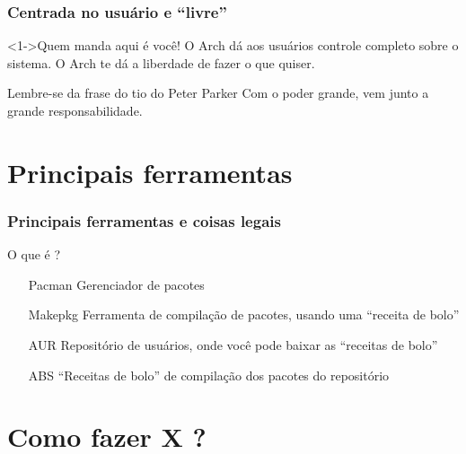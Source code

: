\documentclass{beamer}
\begin{document}
\begin{frame}
    \frametitle{Centrada no usuário e ``livre''}
    \begin{block}<1->{Quem manda aqui é você!}
        O Arch dá aos usuários controle completo sobre o sistema. O Arch te dá a liberdade de fazer o que quiser.
    \end{block}
    \begin{block}{Lembre-se da frase do tio do Peter Parker}
        Com o poder grande, vem junto a grande responsabilidade.
    \end{block}
\end{frame}



\section{Principais ferramentas}

\begin{frame}[fragile]
        \frametitle{Principais ferramentas e coisas legais}
        \begin{block}{O que é ?}
            \begin{itemize}
                \centering
                \item[Pacman] Gerenciador de pacotes
                \item[Makepkg] Ferramenta de compilação de pacotes, usando uma ``receita de bolo''
                \item[AUR] Repositório de usuários, onde você pode baixar as ``receitas de bolo''
                \item[ABS] ``Receitas de bolo'' de compilação dos pacotes do repositório
            \end{itemize}
        \end{block}
\end{frame}

\section{Como fazer X ? }
\end{document}

